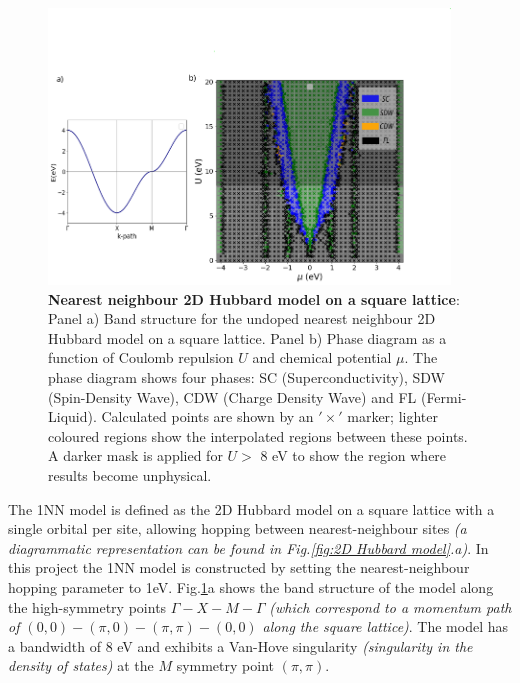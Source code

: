 \documentclass[12pt]{article}
\begin{document}
\begin{figure}[htbp]  %
    \centering
    \includegraphics[width=0.95\textwidth]{1NNphased.png}  %
    \caption{\textbf{Nearest neighbour 2D Hubbard model on a square lattice}: 
    Panel a) Band structure for the undoped nearest neighbour 2D Hubbard model on a square lattice.
    Panel b) Phase diagram as a function of Coulomb repulsion $U$ and chemical 
    potential $\mu$. The phase diagram shows four phases: SC (Superconductivity), SDW (Spin-Density Wave), CDW (Charge Density Wave) and FL (Fermi-Liquid).
    Calculated points are shown by an $'\times '$ marker; lighter coloured regions show the interpolated regions between these points. A darker mask is applied for $U > $ 8 eV to show the 
    region where results become unphysical.}

    \label{fig:1NNpd}
\end{figure} 


\noindent The 1NN model is defined as the 2D Hubbard model on a square lattice with a single orbital per site,  allowing hopping between nearest-neighbour sites \textit{(a diagrammatic representation can be found in Fig.\ref{fig:2D Hubbard model}.a)}. 
In this project the 1NN model is constructed by setting the nearest-neighbour hopping parameter to 1eV.
Fig.\ref{fig:1NNpd}a shows the band structure of the model along the high-symmetry points $\Gamma-X-M-\Gamma$ \textit{ (which correspond to a momentum path of $(0,0)-(\pi,0)-(\pi,\pi)-(0,0)$ along the square lattice)}.
The model has a bandwidth of 8 eV and exhibits a Van-Hove singularity \textit{(singularity in the density of states)} at the $M$ symmetry point \textit{$(\pi,\pi)$}. \par
\medskip
\end{document}

